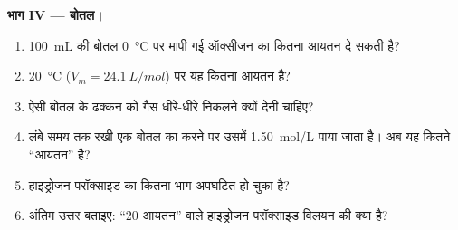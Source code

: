 \begin{problem}
\medskip
\noindent\textbf{भाग IV --- बोतल।}
\begin{enumerate}[resume]
  \item \qty{100}{mL} की बोतल \qty{0}{\celsius} पर मापी गई ऑक्सीजन का
        कितना आयतन दे सकती है?
  \item \qty{20}{\celsius} ($V_m =
        \qty{24.1}{L/mol}$) पर यह कितना आयतन है?
  \item ऐसी बोतल के ढक्कन को गैस धीरे-धीरे निकलने क्यों देनी चाहिए?
  \item लंबे समय तक रखी एक बोतल का  करने पर उसमें
        \qty{1.50}{mol/L} पाया जाता है। अब यह कितने ``आयतन'' है?
  \item हाइड्रोजन परॉक्साइड का कितना भाग अपघटित हो चुका है?
  \item अंतिम उत्तर बताइए: ``20 आयतन'' वाले हाइड्रोजन परॉक्साइड
        विलयन की  क्या है?
\end{enumerate}
\end{problem}
